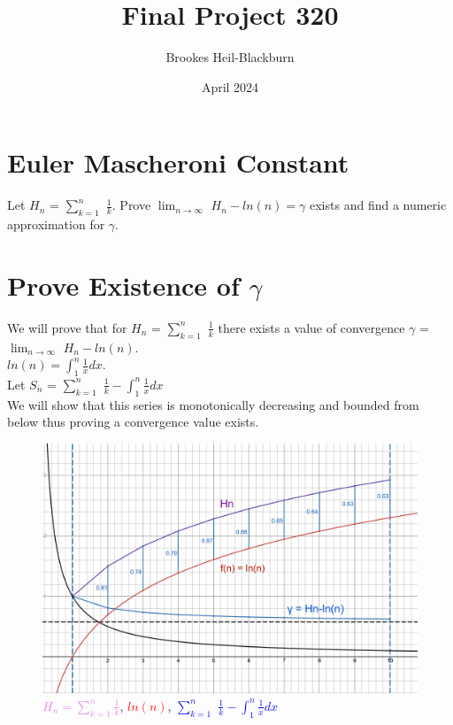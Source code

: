 \documentclass{article}
\title{Final Project 320}
\author{Brookes Heil-Blackburn}
\date{April 2024}
\begin{document}
\maketitle

\section*{Euler Mascheroni Constant}
Let $H_n$ = $\sum_{k=1}^{n}$ $\frac{1}{k}$. Prove $ \lim_{n\to\infty}$ $H_n - ln(n) = \gamma$ exists and find a numeric approximation for $\gamma$.
\FloatBarrier
\section{Prove Existence of $\gamma$}
We will prove that for $H_n$ = $\sum_{k=1}^{n}$ $\frac{1}{k}$ there exists a value of convergence $\gamma$ = $ \lim_{n\to\infty}$ $H_n - ln(n)$. \\
$ln(n)=\int_{1}^{n} \frac{1}{x}dx$.\\
Let $S_n$ = $\sum_{k=1}^{n}$ $\frac{1}{k} - \int_{1}^{n} \frac{1}{x}dx$\\
We will show that this series is monotonically decreasing and bounded from below thus proving a convergence value exists.
\begin{center}
\FloatBarrier
\begin{figure}[htp]
    \centering
    \includegraphics[scale=0.1]{simplified gamma.png}
    \caption{\textcolor{violet}{$H_n = \sum_{k=1}^{n}\frac{1}{k}$}, \textcolor{red}{$ln(n)$}, \textcolor{blue}{$\sum_{k=1}^{n}$ $\frac{1}{k} - \int_{1}^{n} \frac{1}{x}dx$}}
    \label{fig:galaxy}
\end{figure}
\end{center}
\FloatBarrier
\end{document}
